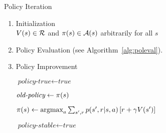 
\begin{algorithm}
\caption{Policy Iteration}
\label{alg:politer}

\begin{enumerate}

	\item Initialization \\
		$V(s) \in \mathcal{R}$
		and
		$\pi(s) \in \mathcal{A}(s)$ arbitrarily for all $s$

	\item Policy Evaluation (see Algorithm~\ref{alg:poleval}).


	\item Policy Improvement
		\begin{algorithmic}[0]
			\State $\textit{policy-true} \gets \textit{true}$


				\State $\textit{old-policy} \gets \pi(s)$

				\State $\pi(s) \gets
					\operatorname*{argmax}_{a} \sum_{s',r} {
						p(s',r|s,a)\left[r+\gamma V(s')\right]
						}$

					\State $\textit{policy-stable} \gets \textit{true}$
				\EndIf

			\EndFor
		\end{algorithmic}

\end{enumerate}

\end{algorithm}
